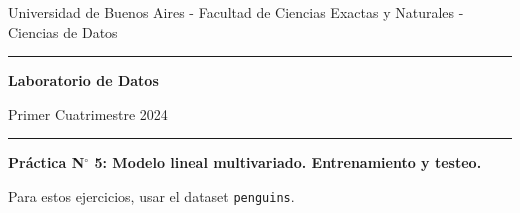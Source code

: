 \documentclass[a4paper,11pt]{article}
\theoremstyle{definition}
\begin{document}
\centerline{{\small Universidad de Buenos Aires - Facultad de Ciencias Exactas y Naturales - Ciencias de Datos}}

\vskip 0.2cm

\hrule

\vskip 0.2cm

 \centerline{{\bf\Large{\sc Laboratorio de Datos}}}

 \vskip 0.2cm

 \centerline{\ttfamily Primer Cuatrimestre 2024}

\vskip 0.2cm

 \hrule

 \bigskip
 \centerline{\bf Práctica N$^\circ$ 5: Modelo lineal multivariado. Entrenamiento y testeo.}
 \bigskip



Para estos ejercicios, usar el dataset \lstinline{penguins}.
\end{document}
